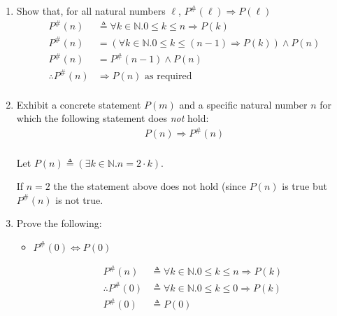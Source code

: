 \documentclass[10pt,\jkfside,a4paper]{article}
\begin{document}
\begin{enumerate}
\begin{enumerate}

\item Show that, for all natural numbers $\ell$, $P^\#(\ell)\Longrightarrow P(\ell)$\\

\begin{equation}\label{phashnimpliesp}
\begin{split}
P^\#(n)&\triangleq \forall k \in \mathbb{N}. 0 \leqslant k \leqslant n \Longrightarrow P(k)\\
P^\#(n)&= (\forall k \in \mathbb{N}. 0\leqslant k \leqslant (n - 1) \Longrightarrow P(k)) \wedge P(n)\\
P^\#(n)&= P^\#(n - 1)\wedge P(n)\\
\therefore P^\#(n) &\Longrightarrow P(n)\text{ as required}\\
\end{split}
\end{equation}

\item Exhibit a concrete statement $P(m)$ and a specific natural number $n$ for which 
the following statement does \textit{not} hold:
\begin{equation}
\begin{split}
P(n) \Longrightarrow P^\#(n)\\
\end{split}
\end{equation}

Let $P(n) \triangleq (\exists k \in \mathbb{N}. n = 2\cdot k)$.

If $n = 2$ the the statement above does not hold (since $P(n)$ is true but $P^\#(n)$ is 
not true.

\item Prove the following:

\begin{itemize}

\item $P^\#(0) \Longleftrightarrow P(0)$

\begin{equation}
\begin{split}
P^\#(n)&\triangleq \forall k \in \mathbb{N}. 0 \leqslant k \leqslant n \Longrightarrow P(k)\\
\therefore P^\#(0)&\triangleq \forall k \in \mathbb{N}. 0 \leqslant k \leqslant 0 \Longrightarrow P(k)\\
P^\#(0)&\triangleq P(0)\\
\end{split}
\end{equation}


\end{itemize}
\end{enumerate}
\end{enumerate}
\end{document}
